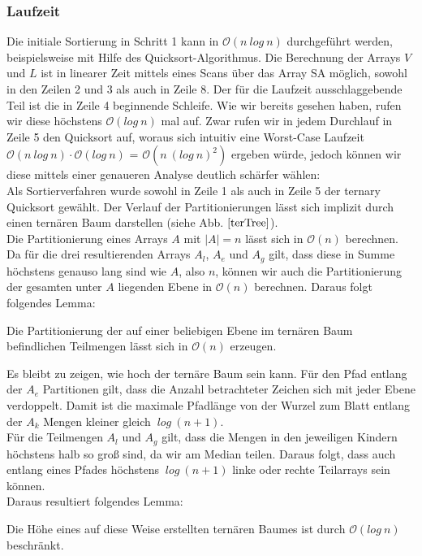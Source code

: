 \subsubsection{Laufzeit}
Die initiale Sortierung in Schritt 1 kann in $\mathcal{O}(n\ log\ n)$ durchgeführt werden, beispielsweise mit Hilfe des Quicksort-Algorithmus. Die Berechnung der Arrays $V$ und $L$ ist in linearer Zeit mittels eines Scans über das Array SA möglich, sowohl in den Zeilen 2 und 3 als auch in Zeile 8. Der für die Laufzeit ausschlaggebende Teil ist die in Zeile 4 beginnende Schleife. Wie wir bereits gesehen haben, rufen wir diese höchstens $\mathcal{O}(log\ n)$ mal auf. Zwar rufen wir in jedem Durchlauf in Zeile 5 den Quicksort auf, woraus sich intuitiv eine Worst-Case Laufzeit $\mathcal{O}(n\ log\ n)\cdot \mathcal{O}(log\ n)$ = $\mathcal{O}(n\ (log\ n)^2)$ ergeben würde, jedoch können wir diese mittels einer genaueren Analyse deutlich schärfer wählen:\\
Als Sortierverfahren wurde sowohl in Zeile 1 als auch in Zeile 5 der ternary Quicksort gewählt. Der Verlauf der Partitionierungen lässt sich implizit durch einen ternären Baum darstellen (siehe Abb. $\ref{terTree}$).\\
Die Partitionierung eines Arrays $A$ mit $|A|=n$ lässt sich in $\mathcal{O}(n)$ berechnen. Da für die drei resultierenden Arrays $A_l$, $A_e$ und $A_g$ gilt, dass diese in Summe höchstens genauso lang sind wie $A$, also $n$, können wir auch die Partitionierung der gesamten unter $A$ liegenden Ebene in $\mathcal{O}(n)$ berechnen. Daraus folgt folgendes Lemma:
\begin{lemma}
Die Partitionierung der auf einer beliebigen Ebene im ternären Baum befindlichen Teilmengen lässt sich in $\mathcal{O}(n)$ erzeugen. 
\end{lemma}
Es bleibt zu zeigen, wie hoch der ternäre Baum sein kann. Für den Pfad entlang der $A_e$ Partitionen gilt, dass die Anzahl betrachteter Zeichen sich mit jeder Ebene verdoppelt. Damit ist die maximale Pfadlänge von der Wurzel zum Blatt entlang der $A_k$ Mengen kleiner gleich $ \ log\ (n+1)$.\\
Für die Teilmengen $A_l$ und $A_g$ gilt, dass die Mengen in den jeweiligen Kindern höchstens halb so groß sind, da wir am Median teilen. Daraus folgt, dass auch entlang eines Pfades höchstens $\ log\ (n+1)$ linke oder rechte Teilarrays sein können.\\
Daraus resultiert folgendes Lemma:
\begin{lemma}
Die Höhe eines auf diese Weise erstellten ternären Baumes ist durch $\mathcal{O}(log\ n)$ beschränkt.
\end{lemma}
